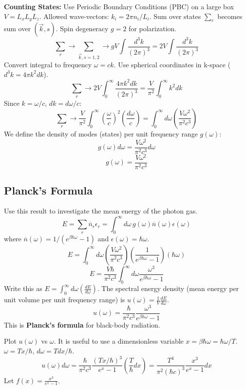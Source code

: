 \documentclass[11pt]{article}
\newcommand{\eps}{\epsilon}
\newcommand{\nbar}{\overline{n}} %
\begin{document}
\textbf{Counting States:}
Use Periodic Boundary Conditions (PBC) on a large box $V=L_x L_y L_z$.
Allowed wave-vectors: $k_i = 2\pi n_i / L_i$.
Sum over states $\sum_r$ becomes sum over $(\vec{k}, s)$. Spin degeneracy $g=2$ for polarization.
\[ \sum_r \to \sum_{\vec{k}, s=1,2} \to g V \int \frac{d^3k}{(2\pi)^3} = 2V \int \frac{d^3k}{(2\pi)^3} \]
Convert integral to frequency $\omega = ck$. Use spherical coordinates in k-space ($d^3k = 4\pi k^2 dk$).
\[ \sum_r \to 2V \int_0^\infty \frac{4\pi k^2 dk}{(2\pi)^3} = \frac{V}{\pi^2} \int_0^\infty k^2 dk \]
Since $k=\omega/c$, $dk=d\omega/c$:
\[ \sum_r \to \frac{V}{\pi^2} \int_0^\infty \left(\frac{\omega}{c}\right)^2 \left(\frac{d\omega}{c}\right) = \int_0^\infty d\omega \left( \frac{V \omega^2}{\pi^2 c^3} \right) \]
We define the density of modes (states) per unit frequency range $g(\omega)$:
\[ g(\omega) d\omega = \frac{V \omega^2}{\pi^2 c^3} d\omega \]
\[ g(\omega) = \frac{V \omega^2}{\pi^2 c^3} \]

\subsection*{Planck's Formula}

Use this result to investigate the mean energy of the photon gas.
\[ E = \sum_r \nbar_r \eps_r = \int_0^\infty d\omega \, g(\omega) \nbar(\omega) \eps(\omega) \]
where $\nbar(\omega) = 1/(e^{\beta\hbar\omega}-1)$ and $\eps(\omega) = \hbar\omega$.
\[ E = \int_0^\infty d\omega \left( \frac{V \omega^2}{\pi^2 c^3} \right) \left( \frac{1}{e^{\beta\hbar\omega} - 1} \right) (\hbar\omega) \]
\[ E = \frac{V \hbar}{\pi^2 c^3} \int_0^\infty d\omega \frac{\omega^3}{e^{\beta\hbar\omega} - 1} \]
Write this as $E = \int_0^\infty d\omega (\frac{dE}{d\omega})$. The spectral energy density (mean energy per unit volume per unit frequency range) is $u(\omega) = \frac{1}{V} \frac{dE}{d\omega}$.
\[ u(\omega) = \frac{\hbar}{\pi^2 c^3} \frac{\omega^3}{e^{\beta\hbar\omega} - 1} \]
This is \textbf{Planck's formula} for black-body radiation.

Plot $u(\omega)$ vs $\omega$. It is useful to use a dimensionless variable $x = \beta\hbar\omega = \hbar\omega/T$. $\omega = Tx/\hbar$, $d\omega = Tdx/\hbar$.
\[ u(\omega) d\omega = \frac{\hbar}{\pi^2 c^3} \frac{(Tx/\hbar)^3}{e^x - 1} \left(\frac{T}{\hbar} dx\right) = \frac{T^4}{\pi^2 (\hbar c)^3} \frac{x^3}{e^x - 1} dx \]
Let $f(x) = \frac{x^3}{e^x-1}$.
\end{document}
